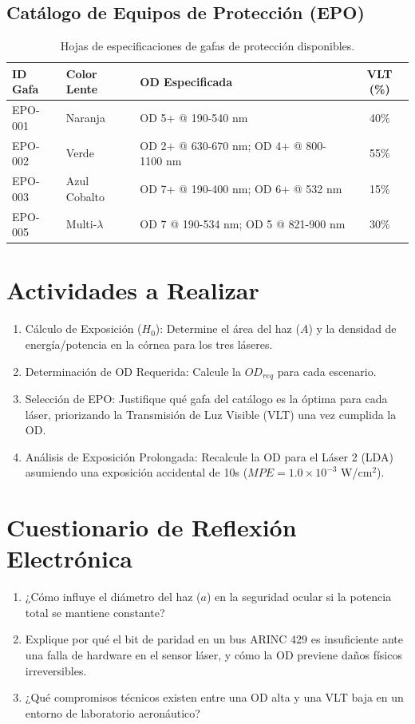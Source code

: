 \documentclass[11pt, a4paper]{article}
\begin{document}
\subsection{Catálogo de Equipos de Protección (EPO)}
\begin{table}[htbp]
	\centering
	\begin{tabular}{lllc}
		\toprule
		ID Gafa & Color Lente     & OD Especificada                         & VLT (\%) \\
		\midrule
		EPO-001 & Naranja         & OD 5+ @ 190-540 nm                      & 40\%     \\
		EPO-002 & Verde           & OD 2+ @ 630-670 nm; OD 4+ @ 800-1100 nm & 55\%     \\
		EPO-003 & Azul Cobalto    & OD 7+ @ 190-400 nm; OD 6+ @ 532 nm      & 15\%     \\
		EPO-005 & Multi-$\lambda$ & OD 7 @ 190-534 nm; OD 5 @ 821-900 nm    & 30\%     \\
		\bottomrule
	\end{tabular}
	\caption{Hojas de especificaciones de gafas de protección disponibles.}
\end{table}

\section{Actividades a Realizar}
\begin{enumerate}
	\item Cálculo de Exposición ($H_0$): Determine el área del haz ($A$) y la densidad de energía/potencia en la córnea para los tres láseres.
	\item Determinación de OD Requerida: Calcule la $OD_{req}$ para cada escenario.
	\item Selección de EPO: Justifique qué gafa del catálogo es la óptima para cada láser, priorizando la Transmisión de Luz Visible (VLT) una vez cumplida la OD.
	\item Análisis de Exposición Prolongada: Recalcule la OD para el Láser 2 (LDA) asumiendo una exposición accidental de 10s ($MPE = 1.0 \times 10^{-3}$ W/cm$^2$).
\end{enumerate}

\section{Cuestionario de Reflexión Electrónica}
\begin{enumerate}
	\item ¿Cómo influye el diámetro del haz ($a$) en la seguridad ocular si la potencia total se mantiene constante?
	\item Explique por qué el bit de paridad en un bus ARINC 429 es insuficiente ante una falla de hardware en el sensor láser, y cómo la OD previene daños físicos irreversibles.
	\item ¿Qué compromisos técnicos existen entre una OD alta y una VLT baja en un entorno de laboratorio aeronáutico?
\end{enumerate}
\end{document}
